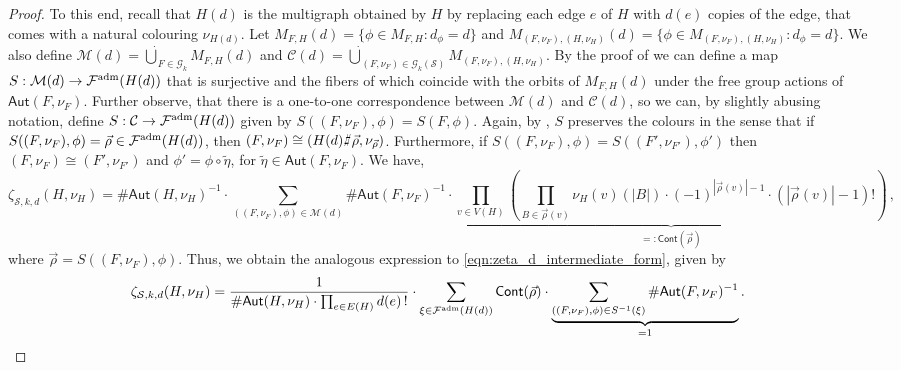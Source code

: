 \documentclass[authorcolumns,numberwithinsect]{no-lipics-v2022}
\def\fracture#1#2{\ensuremath{#1\raisebox{.2ex}{\rotatebox[origin=c]{-15}{$\sharp$}}#2}}
\def\fracture#1#2{\ensuremath{#1\raisebox{.2ex}{\rotatebox[origin=c]{-15}{$\sharp$}}#2}}
\begin{document}
\begin{proof}
To this end, recall that $H(d)$ is the multigraph obtained by $H$ by replacing each edge $e$ of $H$ with $d(e)$ copies of the edge, that comes with a natural colouring $\nu_{H(d)}$. Let $M_{F, H}(d) = \{\phi \in M_{F, H} : d_{\phi} = d\}$ and $M_{(F, \nu_F), (H, \nu_H)}(d) = \{\phi \in M_{(F, \nu_F), (H, \nu_H)} : d_{\phi} = d\}$. We also define $\mathcal{M}(d) = \dot\bigcup_{F \in \mathcal{G}_k}M_{F, H}(d)$ and $\mathcal{C}(d) = \dot\bigcup_{(F, \nu_F) \in \mathcal{G}_{k}(\mathcal{S})}M_{(F, \nu_F), (H, \nu_H)}$. By the proof of  we can define a map $S : \mathcal{M}(d) \to \mathcal{F}^{\textup{adm}}(H(d))$ that is surjective and the fibers of which coincide with the orbits of $M_{F, H}(d)$ under the free group actions of $\mathsf{Aut}(F, \nu_F)$. Further observe, that there is a one-to-one correspondence between $\mathcal{M}(d)$ and $\mathcal{C}(d)$, so we can, by slightly abusing notation, define $S : \mathcal{C} \to \mathcal{F}^{\textup{adm}}(H(d))$ given by $S((F, \nu_F), \phi) = S(F, \phi)$. Again, by , $S$ preserves the colours in the sense that if $S((F, \nu_F), \phi) = \vec\rho \in \mathcal{F}^{\textup{adm}}(H(d))$, then $(F, \nu_F) \cong (\fracture{H(d)}{\vec\rho}, \nu_{\vec\rho})$. Furthermore, if $S((F, \nu_F), \phi) = S((F', \nu_{F'}), \phi')$ then $(F, \nu_F) \cong (F', \nu_{F'})$ and $\phi' = \phi \circ \widetilde{\eta}$, for $\widetilde{\eta} \in \mathsf{Aut}(F, \nu_F)$. We have,
\[\zeta_{\mathcal{S}, k, d}(H, \nu_H) = \#\mathsf{Aut}(H, \nu_H)^{-1}\cdot\!\!\!\!\!\!\sum_{((F, \nu_F), \phi) \in \mathcal{M}(d)}\!\!\!\!\!\!\#\mathsf{Aut}(F, \nu_F)^{-1}\cdot\underbrace{\prod_{v\in V(H)}\left(\prod_{B \in \vec\rho(v)} \nu_H(v)(|B|) \cdot (-1)^{|\vec\rho(v)| -1} \cdot (|\vec\rho(v)|-1)! \right)}_{=:\mathsf{Cont}(\vec\rho)}\,,\]
where $\vec\rho = S((F, \nu_F), \phi)$.
Thus, we obtain the analogous expression to \eqref{eqn:zeta_d_intermediate_form}, given by
\[\zeta_{\mathcal{S}, k, d}(H, \nu_H) = \frac1{\#\mathsf{Aut}(H, \nu_H)\cdot\prod_{e \in E(H)}d(e)\,!}\cdot\sum_{\xi \in \mathcal{F}^{\textup{adm}}(H(d))}\mathsf{Cont}(\vec\rho)\cdot\underbrace{\sum_{((F, \nu_F), \phi) \in S^{-1}(\xi)}\#\mathsf{Aut}(F, \nu_F)^{-1}}_{= 1}.\]
\end{proof}
\end{document}
